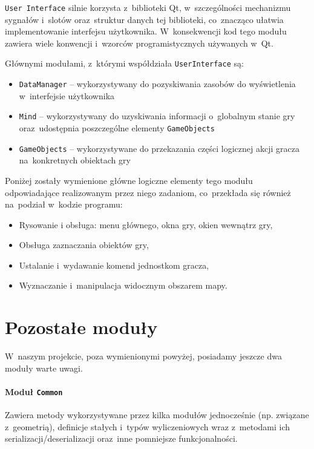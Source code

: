 \documentclass[licencjacka]{pracamgr}
\begin{document}
    \texttt{User Interface} silnie korzysta z~biblioteki Qt, w~szczególności mechanizmu sygnałów i~slotów oraz~struktur
    danych tej biblioteki, co~znacząco ułatwia implementowanie interfejsu użytkownika. W~konsekwencji kod tego modułu
    zawiera wiele konwencji i~wzorców programistycznych używanych w~Qt.

    Głównymi modułami, z~którymi współdziała \texttt{UserInterface} są:
    \begin{itemize}
      \item \texttt{DataManager} -- wykorzystywany do pozyskiwania zasobów do wyświetlenia w~interfejsie użytkownika
      \item \texttt{Mind} -- wykorzystywany do uzyskiwania informacji o~globalnym stanie gry oraz~udostępnia poszczególne
      elementy \texttt{GameObjects}
      \item \texttt{GameObjects} -- wykorzystywane do przekazania części logicznej akcji gracza na~konkretnych obiektach
      gry
    \end{itemize}

    Poniżej zostały wymienione główne logiczne elementy tego modułu odpowiadające realizowanym przez niego zadaniom,
    co~przekłada się również na~podział w~kodzie programu:

    \begin{itemize}
      \item Rysowanie i obsługa: menu głównego, okna gry, okien wewnątrz gry,
      \item Obsługa zaznaczania obiektów gry,
      \item Ustalanie i~wydawanie komend jednostkom gracza,
      \item Wyznaczanie i~manipulacja widocznym obszarem mapy.
    \end{itemize}

  \section{Pozostałe moduły}
    W~naszym projekcie, poza wymienionymi powyżej, posiadamy jeszcze dwa moduły warte uwagi.
    \paragraph{Moduł \texttt{Common}}
      Zawiera metody wykorzystywane przez kilka modułów jednocześnie (np. związane z~geometrią), definicje stałych i~typów
      wyliczeniowych wraz z~metodami ich serializacji/deserializacji oraz~inne pomniejsze funkcjonalności.
\end{document}
